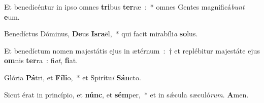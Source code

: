 \item Et benedicéntur in ipso omnes \textbf{tri}bus \textbf{ter}ræ~:~* omnes Gentes magnificá\emph{bunt} \textbf{e}um.
\item Benedíctus Dóminus, \textbf{De}us \textbf{Is}\textbf{ra}ël,~* qui facit mirabíli\emph{a} \textbf{so}lus.
\item Et benedíctum nomen majestátis ejus in ætérnum~:~† et replébitur majestáte ejus \textbf{om}nis \textbf{ter}ra~: fi\emph{at}, \textbf{fi}at.
\item Glória \textbf{Pá}tri, et \textbf{Fí}\textbf{li}o,~* et Spirítu\emph{i} \textbf{Sán}cto.
\item Sicut érat in princípio, et \textbf{núnc}, et \textbf{sém}per,~* et in sǽcula sæculó\emph{rum}. \textbf{A}men.